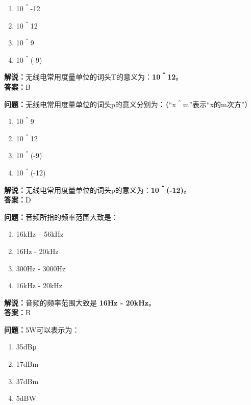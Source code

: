 \documentclass{ctexbook}
\begin{document}
\begin{enumerate}[label=\Alph*), leftmargin=3em]
	\item 10＾-12
	\item 10＾12
	\item 10＾9
	\item 10＾(-9)
\end{enumerate}

\noindent\textbf{解说：}无线电常用度量单位的词头T的意义为：\textbf{10＾12}。\\\noindent\textbf{答案：}B


\bigskip


\noindent\textbf{问题：}无线电常用度量单位的词头p的意义分别为：（“x＾m”表示“x的m次方”）

\begin{enumerate}[label=\Alph*), leftmargin=3em]
	\item 10＾9
	\item 10＾12
	\item 10＾(-9)
	\item 10＾(-12)
\end{enumerate}

\noindent\textbf{解说：}无线电常用度量单位的词头p的意义为：\textbf{10＾(-12)}。\\\noindent\textbf{答案：}D


\bigskip


\noindent\textbf{问题：}音频所指的频率范围大致是：

\begin{enumerate}[label=\Alph*), leftmargin=3em]
	\item 16kHz – 56kHz
	\item 16Hz - 20kHz
	\item 300Hz - 3000Hz
	\item 16kHz - 20kHz
\end{enumerate}

\noindent\textbf{解说：}音频的频率范围大致是 \textbf{16Hz - 20kHz}。\\\noindent\textbf{答案：}B %


\bigskip


\noindent\textbf{问题：}5W可以表示为：

\begin{enumerate}[label=\Alph*), leftmargin=3em]
	\item 35dBμ
	\item 17dBm
	\item 37dBm
	\item 5dBW
\end{enumerate}
\end{document}
